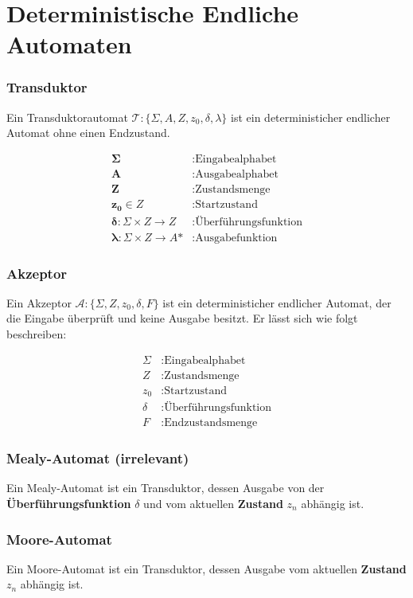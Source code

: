 
\sloppy
\chapter{Deterministische Endliche Automaten}
\fussy
\subsection{Transduktor}
\begin{definition}
Ein Transduktorautomat $\mathcal{T}: \{\Sigma, A, Z, z_{0}, \delta, \lambda\}$ ist ein deterministicher endlicher Automat ohne einen Endzustand.
\end{definition}
\begin{align*}
    \mathbf{\Sigma} &: \text{Eingabealphabet}\\
    \mathbf{A} &: \text{Ausgabealphabet}\\
    \mathbf{Z} &: \text{Zustandsmenge}\\
    \mathbf{z_{0}} \in Z &: \text{Startzustand}\\
    \mathbf{\delta }: \Sigma \times Z \rightarrow Z &: \text{Überführungsfunktion}\\
    \mathbf{\lambda }: \Sigma \times Z \rightarrow A\text{*} &: \text{Ausgabefunktion}
\end{align*}

\subsection{Akzeptor}
\begin{definition}
Ein Akzeptor $\mathcal{A}: \{\Sigma, Z, z_{0}, \delta, F\}$ ist ein deterministicher endlicher Automat, der die Eingabe überprüft und keine Ausgabe besitzt. Er lässt sich wie folgt beschreiben:
\end{definition}
    \begin{align*}
    \Sigma &: \text{Eingabealphabet}\\
    Z &: \text{Zustandsmenge}\\
    z_{0} &: \text{Startzustand}\\
    \delta &: \text{Überführungsfunktion}\\
    F &: \text{Endzustandsmenge}
\end{align*}

\subsection{Mealy-Automat (irrelevant)}
\begin{definition}
    Ein Mealy-Automat ist ein Transduktor, dessen Ausgabe von der \textbf{Überführungsfunktion} $\delta$ und vom aktuellen \textbf{Zustand} $z_n$ abhängig ist.
\end{definition}
\subsection{Moore-Automat}
\begin{definition}
    Ein Moore-Automat ist ein Transduktor, dessen Ausgabe vom aktuellen \textbf{Zustand} $z_n$ abhängig ist.
\end{definition}